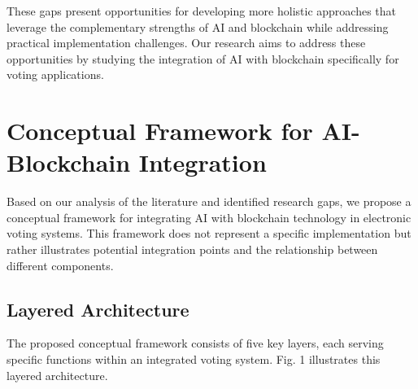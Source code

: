 \documentclass[conference]{IEEEtran}
\begin{document}
These gaps present opportunities for developing more holistic approaches that leverage the complementary strengths of AI and blockchain while addressing practical implementation challenges. Our research aims to address these opportunities by studying the integration of AI with blockchain specifically for voting applications.

\section{Conceptual Framework for AI-Blockchain Integration}
Based on our analysis of the literature and identified research gaps, we propose a conceptual framework for integrating AI with blockchain technology in electronic voting systems. This framework does not represent a specific implementation but rather illustrates potential integration points and the relationship between different components.

\subsection{Layered Architecture}
The proposed conceptual framework consists of five key layers, each serving specific functions within an integrated voting system. Fig. 1 illustrates this layered architecture.
\end{document}
